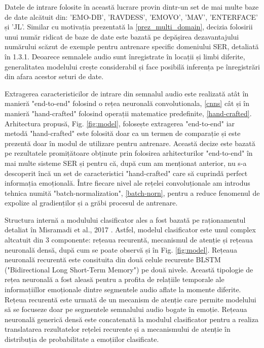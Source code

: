 \documentclass[a4paper,12pt]{book}
\begin{document}
					Datele de intrare folosite în această lucrare provin dintr-un set de mai multe baze de date alcătuit din: 'EMO-DB', 'RAVDESS', 'EMOVO', 'MAV', 'ENTERFACE' și 'JL'. Similar cu motivația prezentată la \ref{prez_multi_domain}, decizia folosirii unui număr ridicat de baze de date este bazată pe depășirea dezavantajului numărului scăzut de exemple pentru antrenare specific domeniului SER, detaliată în 1.3.1. Deoarece semnalele audio sunt înregistrate în locații și limbi diferite, generalitatea modelului crește considerabil și face posibilă inferența pe înregistrări din afara acestor seturi de date. \par
					
					Extragerea caracteristicilor de intrare din semnalul audio este realizată atât în manieră "end-to-end" folosind o rețea neuronală convolutionala, \ref{cnns} cât și în manieră "hand-crafted" folosind operații matematice predefinite, \ref{hand-crafted}. Arhitectura propusă, Fig. \ref{fig:model}, folosește extragerea "end-to-end" iar metodă "hand-crafted" este folosită doar ca un termen de comparație și este prezentă doar în modul de utilizare pentru antrenare. Această decize este bazată pe rezultatele promițătoare obținute prin folosirea arhitecturilor "end-to-end"  în mai multe sisteme SER și pentru că, după cum am menționat anterior, nu s-a descoperit încă un set de caracteristici "hand-crafted" care să cuprindă perfect informația emoțională. Între fiecare nivel ale rețelei convoluționale am introdus tehnica numită "batch-normalization", \ref{batch-norn}, pentru a reduce fenomenul de expolize al gradienților și a grăbi procesul de antrenare. \par
					Structura internă a modulului clasificator ales a fost bazată pe raționamentul detaliat în Misramadi et al., 2017 \cite{misramadi}. Astfel, modelul clasificator este unul complex altcatuit din 3 componente: rețeaua recurentă, mecanismul de atenție și rețeaua neuronală densă, după cum se poate observă și în Fig. \ref{fig:model}.  
					Rețeaua neuronală recurentă este consituita din două celule recurente BLSTM ("Bidirectional Long Short-Term Memory") pe două nivele. Această tipologie de rețea neuronală a fost aleasă pentru a profita de relațiile temporale ale informațiillor emoționale dintre segmentele audio aflate la momente diferite. Rețeua recurentă este urmată de un mecanism de atenție care permite modelului să se focuseze doar pe segmentele semnalului audio bogate în emoție. Rețeaua neuronală generică densă este concatenată la modulul clasificator pentru a realiza translatarea rezultatelor rețelei recurente și a mecanismului de atenție în distribuția de probabilitate a emoțiilor clasificate.\par
					
\end{document}
